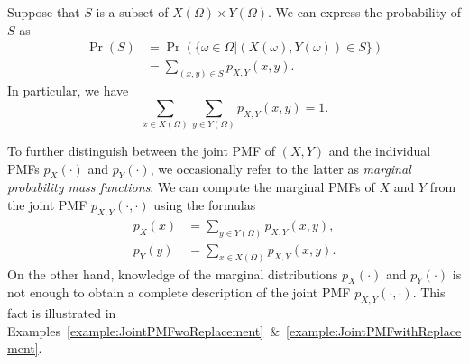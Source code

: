 Suppose that $S$ is a subset of $X(\Omega) \times Y(\Omega)$.
We can express the probability of $S$ as
\begin{equation*}
\begin{split}
\Pr (S) &= \Pr (\{ \omega \in \Omega | (X(\omega), Y(\omega)) \in S \}) \\
&= \sum_{(x,y) \in S} p_{X,Y} (x, y) .
\end{split}
\end{equation*}
In particular, we have
\begin{equation*}
\sum_{x \in X(\Omega)} \sum_{y \in Y(\Omega)} p_{X,Y} (x, y) = 1.
\end{equation*}

To further distinguish between the joint PMF of $(X, Y)$ and the individual PMFs $p_X (\cdot)$ and $p_Y (\cdot)$, we occasionally refer to the latter as \emph{marginal probability mass functions}.  
We can compute the marginal PMFs of $X$ and $Y$ from the joint PMF $p_{X,Y}(\cdot,\cdot)$ using the formulas
\begin{align*}
p_X (x) &= \sum_{y \in Y(\Omega)} p_{X,Y} (x,y), \\
p_Y (y) &= \sum_{x \in X(\Omega)} p_{X,Y} (x,y).
\end{align*}
On the other hand, knowledge of the marginal distributions $p_X (\cdot)$ and $p_Y (\cdot)$ is not enough to obtain a complete description of the joint PMF $p_{X,Y} (\cdot,\cdot)$.
This fact is illustrated in Examples~\ref{example:JointPMFwoReplacement}~\&~\ref{example:JointPMFwithReplacement}.

